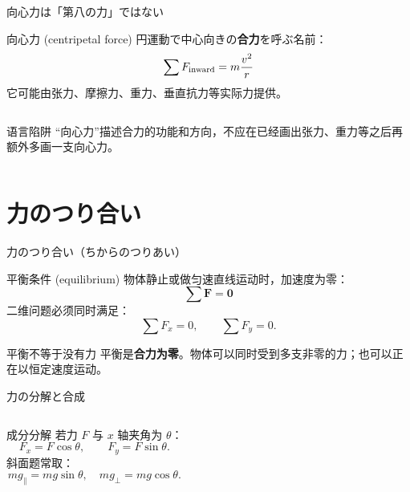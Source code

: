 \documentclass[notheorems,aspectratio=169]{beamer}
\newcommand{\key}[1]{\textbf{\color{ChinaRed}#1}}
\newcommand{\en}[1]{\textcolor{GraphGray}{\scriptsize(#1)}}
\newcommand{\forcearrow}[5]{%
  \draw[-{Latex[length=3mm]},very thick,#5] (#1,#2)--++(#3,#4);}
\begin{document}
\begin{frame}{向心力は「第八の力」ではない}
\begin{block}{向心力 \en{centripetal force}}
円運動で中心向きの\key{合力}を呼ぶ名前：
\[
\sum F_{\rm inward}=m\frac{v^2}{r}
\]
它可能由张力、摩擦力、重力、垂直抗力等实际力提供。
\end{block}
\begin{columns}[c]
\centering
{}
\begin{alertblock}{语言陷阱}
“向心力”描述合力的功能和方向，不应在已经画出张力、重力等之后再额外多画一支向心力。
\end{alertblock}
\end{columns}
\end{frame}

\section{力のつり合い}

\begin{frame}{力のつり合い（ちからのつりあい）}
\begin{block}{平衡条件 \en{equilibrium}}
物体静止或做匀速直线运动时，加速度为零：
\[
\boxed{\sum\bm F=\bm0}
\]
二维问题必须同时满足：
\[
\boxed{\sum F_x=0},\qquad \boxed{\sum F_y=0}.
\]
\end{block}
\begin{alertblock}{平衡不等于没有力}
平衡是\key{合力为零}。物体可以同时受到多支非零的力；也可以正在以恒定速度运动。
\end{alertblock}
\end{frame}

\begin{frame}{力の分解と合成}
\begin{columns}[c]
\begin{block}{成分分解}
若力 $F$ 与 $x$ 轴夹角为 $\theta$：
\[
F_x=F\cos\theta,\qquad F_y=F\sin\theta.
\]
斜面题常取：
\[
mg_{\parallel}=mg\sin\theta,
\quad mg_{\perp}=mg\cos\theta.
\]
\end{block}
\centering
{}
\end{columns}
\end{frame}
\end{document}
